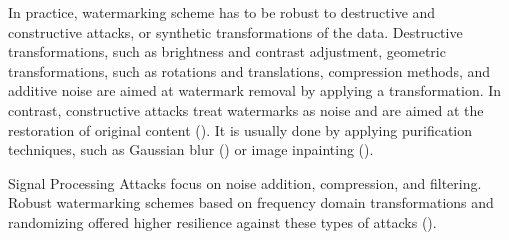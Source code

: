 In practice, watermarking scheme has to be robust to destructive and constructive attacks, or synthetic transformations of the data. Destructive transformations,  such as brightness and contrast adjustment, geometric transformations, such as rotations and translations, compression methods, and additive noise are aimed at watermark removal by applying a transformation. In contrast, constructive attacks treat watermarks as noise and are aimed at the restoration of original content (\cite{zhang2024robust}). It is usually done by applying purification techniques, such as Gaussian blur (\cite{hosam2019attacking}) or image inpainting (\cite{liu2021wdnet,xu2017automatic}).

Signal Processing Attacks focus on noise addition, compression, and filtering. Robust watermarking schemes based on frequency domain transformations and randomizing offered higher resilience against these types of attacks (\cite{Taran_2019_CVPR}).